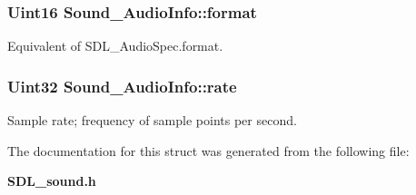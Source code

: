 \subsubsection[{format}]{\setlength{\rightskip}{0pt plus 5cm}Uint16 Sound\-\_\-\-Audio\-Info\-::format}\label{structSound__AudioInfo_afc1f02fd774a0e1d35109360496390eb}
Equivalent of S\-D\-L\-\_\-\-Audio\-Spec.\-format. 
\subsubsection[{rate}]{\setlength{\rightskip}{0pt plus 5cm}Uint32 Sound\-\_\-\-Audio\-Info\-::rate}\label{structSound__AudioInfo_abc8310e37ae527e5d92e675655d944ee}
Sample rate; frequency of sample points per second. 

The documentation for this struct was generated from the following file\-:\begin{DoxyCompactItemize}
\item 
{\bf S\-D\-L\-\_\-sound.\-h}\end{DoxyCompactItemize}
